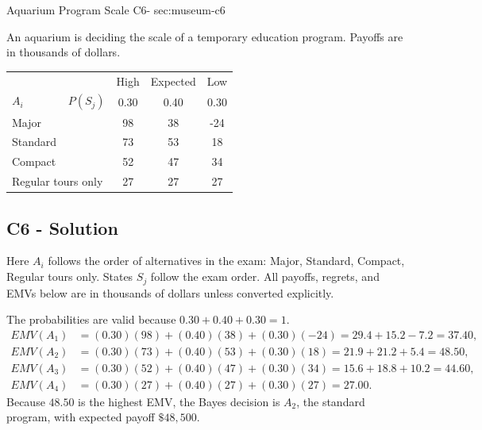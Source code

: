 \sectionScored
	{Aquarium Program Scale}
	{C6-}
	{sec:museum-c6}
	{
	An aquarium is deciding the scale of a temporary education program. Payoffs are in thousands of dollars.
		\begin{center}\setlength{\tabcolsep}{2pt}\renewcommand{\arraystretch}{1.1}
			\begin{tabular}{lccc}\toprule
			&High&Expected&Low\\
			$A_i \qquad \qquad P(S_j)$&0.30&0.40&0.30\\ \midrule
			Major&98&38&-24\\
			Standard&73&53&18\\
			Compact&52&47&34\\
			Regular tours only&27&27&27\\ \bottomrule
			\end{tabular}
		\end{center}


	\label{subsec:museum-c6-solution}
	\subsection*{C6 - Solution }

	Here $A_i$ follows the order of alternatives in the exam: Major, Standard, Compact, Regular tours only. States $S_j$ follow the exam order. All payoffs, regrets, and EMVs below are in thousands of dollars unless converted explicitly.

		The probabilities are valid because $0.30+0.40+0.30=1$.
		\begin{align*}
EMV(A_1)&=(0.30)(98)+(0.40)(38)+(0.30)(-24)=29.4+15.2-7.2=37.40,\\
			EMV(A_2)&=(0.30)(73)+(0.40)(53)+(0.30)(18)=21.9+21.2+5.4=48.50,\\
			EMV(A_3)&=(0.30)(52)+(0.40)(47)+(0.30)(34)=15.6+18.8+10.2=44.60,\\
			EMV(A_4)&=(0.30)(27)+(0.40)(27)+(0.30)(27)=27.00.
		\end{align*}
		Because $48.50$ is the highest EMV, the Bayes decision is $\boxed{A_2}$, the standard program, with expected payoff $\$48{,}500$.

	}

